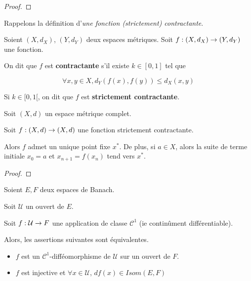 \ifdefined\outputproof
\begin{proof}

\end{proof}
\fi

Rappelons la définition d'\textit{une fonction (strictement) contractante}.

\begin{definition}
	Soient $(X, d_{X})$, $(Y, d_{Y})$ deux espaces métriques.
	Soit $f : (X, d_{X}) \rightarrow (Y, d_{Y})$ une fonction.

	On dit que $f$ est \textbf{contractante} s'il existe $k \in [0, 1]$ tel que

	\begin{equation*}
		\forall x, y \in X, d_{Y}(f(x), f(y)) \leq d_{X}(x, y)
	\end{equation*}

	Si $k \in [0, 1[$, on dit que $f$  est \textbf{strictement contractante}.
\end{definition}

\begin{theorem} 
	\label{theorem:point_fixe_banach}
	Soit $(X, d)$ un espace métrique complet.

	Soit $f : (X, d) \rightarrow (X, d)$ une fonction strictement contractante.

	Alors $f$ admet un unique point fixe $x^{*}$.
	De plus, si $a \in X$, alors la suite de terme initiale $x_{0} = a$ et $x_{n
	+ 1} = f(x_{n})$ tend vers $x^{*}$.
\end{theorem}

\ifdefined\outputproof
\begin{proof}

\end{proof}
\fi


\begin{theorem}
	\label{theorem:inversion_globale}
	Soient $E, F$ deux espaces de Banach.

	Soit $\mathcal{U}$ un ouvert de $E$.

	Soit $f : \mathcal{U} \rightarrow F$ une application de classe
	$\mathcal{C}^{1}$ (ie continûment différentiable).

	Alors, les assertions suivantes sont équivalentes.

	\begin{itemize}
		\item $f$ est un $\mathcal{C}^{1}$-difféomorphisme de $\mathcal{U}$ sur
			un ouvert de $F$.
		\item $f$ est injective et $\forall x \in \mathcal{U}$, $df(x) \in
			Isom(E, F)$
	\end{itemize}
\end{theorem}

